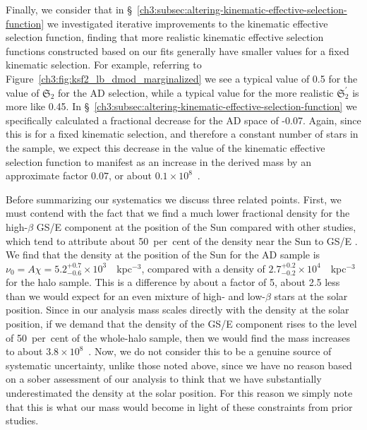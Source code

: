 Finally, we consider that in \S~\ref{ch3:subsec:altering-kinematic-effective-selection-function} we investigated iterative improvements to the kinematic effective selection function, finding that more realistic kinematic effective selection functions constructed based on our fits generally have smaller values for a fixed kinematic selection. For example, referring to Figure~\ref{ch3:fig:ksf2_lb_dmod_marginalized} we see a typical value of 0.5 for the value of $\mathfrak{S}_{2}$ for the AD selection, while a typical value for the more realistic $\mathfrak{S}_{2}^{\prime}$ is more like 0.45. In \S~\ref{ch3:subsec:altering-kinematic-effective-selection-function} we specifically calculated a fractional decrease for the AD space of -0.07. Again, since this is for a fixed kinematic selection, and therefore a constant number of stars in the sample, we expect this decrease in the value of the kinematic effective selection function to manifest as an increase in the derived mass by an approximate factor $0.07$, or about $0.1\times10^{8}$~\Msun.

Before summarizing our systematics we discuss three related points. First, we must contend with the fact that we find a much lower fractional density for the high-$\beta$ GS/E component at the position of the Sun compared with other studies, which tend to attribute about 50~per~cent of the density near the Sun to GS/E \parencite{belokurov18,lancaster19,iorio21}. We find that the density at the position of the Sun for the AD sample is $\nu_{0} = A\chi = 5.2^{+0.7}_{-0.6}\times 10^{3}$~\Msun~kpc$^{-3}$, compared with a density of $2.7^{+0.2}_{-0.2}\times 10^{4}$~\Msun~kpc$^{-3}$ for the halo sample. This is a difference by about a factor of 5, about 2.5 less than we would expect for an even mixture of high- and low-$\beta$ stars at the solar position. Since in our analysis mass scales directly with the density at the solar position, if we demand that the density of the GS/E component rises to the level of 50~per~cent of the whole-halo sample, then we would find the mass increases to about $3.8\times10^{8}$~\Msun. Now, we do not consider this to be a genuine source of systematic uncertainty, unlike those noted above, since we have no reason based on a sober assessment of our analysis to think that we have substantially underestimated the density at the solar position. For this reason we simply note that this is what our mass would become in light of these constraints from prior studies.

